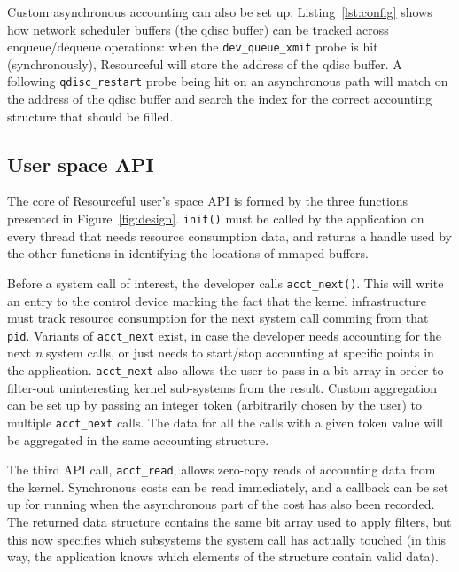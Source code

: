 \documentclass[letterpaper,twocolumn,10pt]{article}
\newcommand{\pname}{Resourceful}
\begin{document}
Custom asynchronous accounting can also be set up: Listing~\ref{lst:config}
shows how network scheduler buffers (the qdisc buffer) can be tracked across
enqueue/dequeue operations: when the \texttt{dev\_queue\_xmit} probe is hit
(synchronously), \pname{ }will store the address of the qdisc buffer. A
following \texttt{qdisc\_restart} probe being hit on an asynchronous path will
match on the address of the qdisc buffer and search the index for the correct
accounting structure that should be filled.


\subsection{User space API}
The core of \pname{ }user's space API is formed by the three functions presented
in Figure~\ref{fig:design}. \texttt{init()} must be called by the application on
every thread that needs resource consumption data, and returns a handle used by
the other functions in identifying the locations of mmaped buffers. 

Before a system call of interest, the developer calls
\texttt{acct\_next()}. This will write an entry to the control device marking
the fact that the kernel infrastructure must track resource consumption for the
next system call comming from that \texttt{pid}. Variants of
\texttt{acct\_next} exist, in case the developer needs accounting for the next
\textit{n} system calls, or just needs to start/stop accounting at specific
points in the application. \texttt{acct\_next} also allows the user to pass in a
bit array in order to filter-out uninteresting kernel sub-systems from the
result. Custom aggregation can be set up by passing an integer token
(arbitrarily chosen by the user) to multiple \texttt{acct\_next} calls. The data
for all the calls with a given token value will be aggregated in the same
accounting structure.

The third API call, \texttt{acct\_read}, allows zero-copy reads of accounting
data from the kernel. Synchronous costs can be read immediately, and a callback
can be set up for running when the asynchronous part of the cost has also been
recorded. The returned data structure contains the same bit array used to apply
filters, but this now specifies which subsystems the system call has actually touched
(in this way, the application knows which elements of the structure contain valid data).
\end{document}

